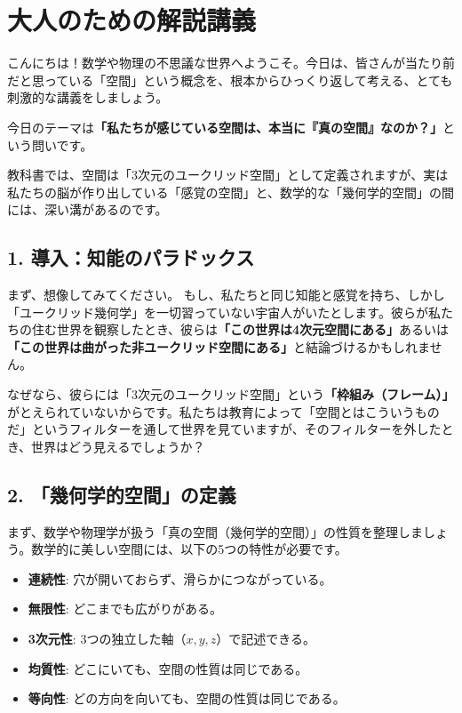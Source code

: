 \documentclass[a4paper,11pt,openany]{ltjsbook}
\begin{document}
\section{大人のための解説講義}
\begin{lecturebox}
こんにちは！数学や物理の不思議な世界へようこそ。今日は、皆さんが当たり前だと思っている「空間」という概念を、根本からひっくり返して考える、とても刺激的な講義をしましょう。

今日のテーマは\textbf{「私たちが感じている空間は、本当に『真の空間』なのか？」}という問いです。

教科書では、空間は「3次元のユークリッド空間」として定義されますが、実は私たちの脳が作り出している「感覚の空間」と、数学的な「幾何学的空間」の間には、深い溝があるのです。

\subsection*{1. 導入：知能のパラドックス}
まず、想像してみてください。
もし、私たちと同じ知能と感覚を持ち、しかし「ユークリッド幾何学」を一切習っていない宇宙人がいたとします。彼らが私たちの住む世界を観察したとき、彼らは\textbf{「この世界は4次元空間にある」}あるいは\textbf{「この世界は曲がった非ユークリッド空間にある」}と結論づけるかもしれません。

なぜなら、彼らには「3次元のユークリッド空間」という\textbf{「枠組み（フレーム）」}がとえられていないからです。私たちは教育によって「空間とはこういうものだ」というフィルターを通して世界を見ていますが、そのフィルターを外したとき、世界はどう見えるでしょうか？

\subsection*{2. 「幾何学的空間」の定義}
まず、数学や物理学が扱う「真の空間（幾何学的空間）」の性質を整理しましょう。数学的に美しい空間には、以下の5つの特性が必要です。

\begin{itemize}[leftmargin=2em]
\item \textbf{連続性}: 穴が開いておらず、滑らかにつながっている。
\item \textbf{無限性}: どこまでも広がりがある。
\item \textbf{3次元性}: 3つの独立した軸（$x, y, z$）で記述できる。
\item \textbf{均質性}: どこにいても、空間の性質は同じである。
\item \textbf{等向性}: どの方向を向いても、空間の性質は同じである。
\end{itemize}


\end{lecturebox}
\end{document}
